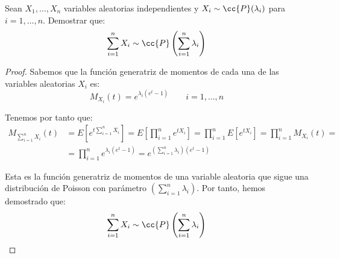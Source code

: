 \documentclass[12pt]{article}
\begin{document}
    \begin{ejercicio}
        Sean $X_1, \dots, X_n$ variables aleatorias independientes y $X_i\sim \cc{P}(\lambda_i)$ para $i=1,\dots,n$. Demostrar que:
        \begin{equation*}
            \sum_{i=1}^{n}X_i \sim \cc{P}\left(\sum_{i=1}^{n}\lambda_i\right)
        \end{equation*}
        \begin{proof}
            Sabemos que la función generatriz de momentos de cada una de las variables aleatorias $X_i$ es:
            \begin{equation*}
                M_{X_i}(t) = e^{\lambda_i(e^t-1)} \qquad i=1,\dots,n
            \end{equation*}
    
            Tenemos por tanto que:
            \begin{align*}
                M_{\sum\limits_{i=1}^{n}X_i}(t) &= E\left[e^{t\sum\limits_{i=1}^{n}X_i}\right] = E\left[\prod_{i=1}^{n}e^{tX_i}\right] = \prod_{i=1}^{n}E[e^{tX_i}] = \prod_{i=1}^{n}M_{X_i}(t) =\\
                &= \prod_{i=1}^{n}e^{\lambda_i(e^t-1)} = e^{\left(\sum\limits_{i=1}^{n}\lambda_i\right)(e^t-1)}
            \end{align*}
    
            Esta es la función generatriz de momentos de una variable aleatoria que sigue una distribución de Poisson con parámetro $\left(\sum\limits_{i=1}^{n}\lambda_i\right)$. Por tanto, hemos demostrado que:
            \begin{equation*}
                \sum_{i=1}^{n}X_i \sim \cc{P}\left(\sum_{i=1}^{n}\lambda_i\right)
            \end{equation*}
        \end{proof}
    \end{ejercicio}
    
\end{document}
